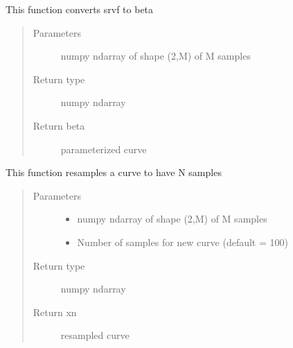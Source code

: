 \documentclass[letterpaper,10pt,english]{sphinxmanual}
\begin{document}
\begin{fulllineitems}
\label{\detokenize{curve_functions:curve_functions.q_to_curve}}
This function converts srvf to beta
\begin{quote}\begin{description}
\item[{Parameters}] \leavevmode
{} \textendash{} numpy ndarray of shape (2,M) of M samples

\item[{Return type}] \leavevmode
numpy ndarray

\item[{Return beta}] \leavevmode
parameterized curve

\end{description}\end{quote}

\end{fulllineitems}


\begin{fulllineitems}
\label{\detokenize{curve_functions:curve_functions.resamplecurve}}
This function resamples a curve to have N samples
\begin{quote}\begin{description}
\item[{Parameters}] \leavevmode\begin{itemize}
\item {} 
 \textendash{} numpy ndarray of shape (2,M) of M samples

\item {} 
 \textendash{} Number of samples for new curve (default = 100)

\end{itemize}

\item[{Return type}] \leavevmode
numpy ndarray

\item[{Return xn}] \leavevmode
resampled curve

\end{description}\end{quote}

\end{fulllineitems}
\end{document}

